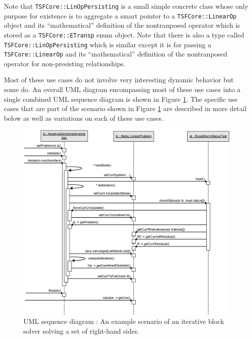 \documentclass[pdf,ps2pdf,11pt]{SANDreport}
\begin{document}
Note that {}\texttt{TSFCore::\-Lin\-Op\-Persisting} is a small simple
concrete class whose only purpose for existence is to aggregate a
smart pointer to a {}\texttt{TSFCore::\-Linear\-Op} object and its
``mathematical'' definition of the nontranposed operator which is
stored as a {}\texttt{TSFCore::\-ETransp} enum object.  Note that
there is also a type called {}\texttt{TSFCore::\-Lin\-Op\-Persisting}
which is similar except it is for passing a
{}\texttt{TSFCore::\-Linear\-Op} and its ``mathematical'' definition
of the nontranposed operator for non-presisting relationships.

Most of these use cases do not involve very interesting dynamic
behavior but some do.  An overall UML diagram encompassing most of
these use cases into a single combined UML sequence diagram is shown
in Figure {}\ref{belos:fig:BelosSequence}.  The specific use cases
that are part of the scenario shown in Figure
{}\ref{belos:fig:BelosSequence} are described in more detail below as
well as variations on each of these use cases.

{\bsinglespace
\begin{figure}
\begin{center}
\includegraphics*[scale=0.85]{BelosSequence}
\end{center}
\caption{
\label{belos:fig:BelosSequence}
UML sequence diagram : An example
scenario of an iterative block solver solving a set of right-hand
sides.}
\end{figure}
\esinglespace}
\end{document}

